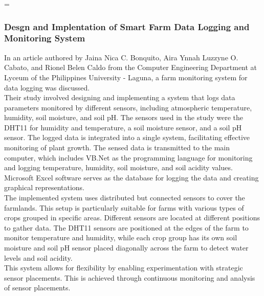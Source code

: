 =\documentclass[12pt, a4paper]{article}
\begin{document}
\subsubsection{Desgn and Implentation of Smart Farm Data Logging and Monitoring System}
In an article authored by Jaina Nica C. Bonquito, Aira Ynnah Luzzyne O. Cabato, and Rionel Belen Caldo \cite{bongulto2016design} from the Computer Engineering Department at Lyceum of the Philippines University - Laguna, a farm monitoring system for data logging was discussed.\\
Their study involved designing and implementing a system that logs data parameters monitored by different sensors, including atmospheric temperature, humidity, soil moisture, and soil pH. The sensors used in the study were the DHT11 for humidity and temperature, a soil moisture sensor, and a soil pH sensor. The logged data is integrated into a single system, facilitating effective monitoring of plant growth. The sensed data is transmitted to the main computer, which includes VB.Net as the programming language for monitoring and logging temperature, humidity, soil moisture, and soil acidity values. Microsoft Excel software serves as the database for logging the data and creating graphical representations.\\
The implemented system uses distributed but connected sensors to cover the farmlands. This setup is particularly suitable for farms with various types of crops grouped in specific areas. Different sensors are located at different positions to gather data. The DHT11 sensors are positioned at the edges of the farm to monitor temperature and humidity, while each crop group has its own soil moisture and soil pH sensor placed diagonally across the farm to detect water levels and soil acidity.\\
This system allows for flexibility by enabling experimentation with strategic sensor placements. This is achieved through continuous monitoring and analysis of sensor placements.
  
\end{document}
